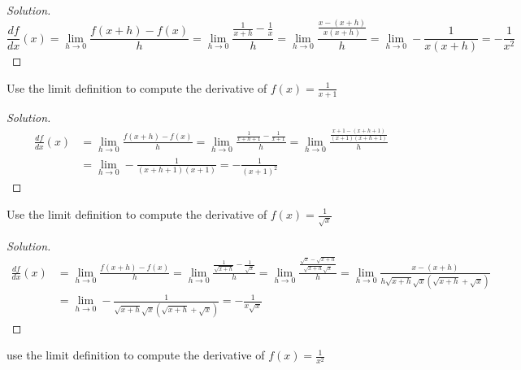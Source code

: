 \documentclass[crop=false,class=book,oneside]{standalone}
\begin{document}
            \begin{proof}[Solution]
            \begin{equation*}
                \frac{df}{dx}(x)=\underset{h\rightarrow 0}{\lim}\frac{f(x+h)-f(x)}{h}=\underset{h\rightarrow 0}{\lim}\frac{\frac{1}{x+h}-\frac{1}{x}}{h}=\underset{h\rightarrow 0}{\lim}\frac{\frac{x-(x+h)}{x(x+h)}}{h}=\underset{h\rightarrow 0}{\lim}-\frac{1}{x(x+h)}=-\frac{1}{x^{2}}
            \end{equation*}
            \end{proof}
            \begin{problem}
            Use the limit definition to compute the derivative of $f(x)=\frac{1}{x+1}$
            \end{problem}
            \begin{proof}[Solution]
            \begin{align*}
                \frac{df}{dx}(x)&=\underset{h\rightarrow 0}{\lim}\frac{f(x+h)-f(x)}{h}=\underset{h\rightarrow 0}{\lim}\frac{\frac{1}{x+h+1}-\frac{1}{x+1}}{h}=\underset{h\rightarrow 0}{\lim}\frac{\frac{x+1-(x+h+1)}{(x+1)(x+h+1)}}{h}\\
                &=\underset{h\rightarrow 0}{\lim}-\frac{1}{(x+h+1)(x+1)}=-\frac{1}{(x+1)^{2}}
            \end{align*}
            \end{proof}
            \begin{problem}
            Use the limit definition to compute the derivative of $f(x)=\frac{1}{\sqrt{x}}$
            \end{problem}
            \begin{proof}[Solution]
            \begin{align*}
                \frac{df}{dx}(x)&=\underset{h\rightarrow 0}{\lim}\frac{f(x+h)-f(x)}{h}=\underset{h\rightarrow 0}{\lim}\frac{\frac{1}{\sqrt{x+h}}-\frac{1}{\sqrt{x}}}{h}=\underset{h\rightarrow 0}{\lim}\frac{\frac{\sqrt{x}-\sqrt{x+h}}{\sqrt{x+h}\sqrt{x}}}{h}=\underset{h\rightarrow 0}{\lim}\frac{x-(x+h)}{h\sqrt{x+h}\sqrt{x}(\sqrt{x+h}+\sqrt{x})}\\
                &=\underset{h\rightarrow 0}{\lim}-\frac{1}{\sqrt{x+h}\sqrt{x}(\sqrt{x+h}+\sqrt{x})}=-\frac{1}{x\sqrt{x}}
            \end{align*}
            \end{proof}
            \begin{problem}
            use the limit definition to compute the derivative of $f(x)=\frac{1}{x^{2}}$
            \end{problem}
\end{document}
